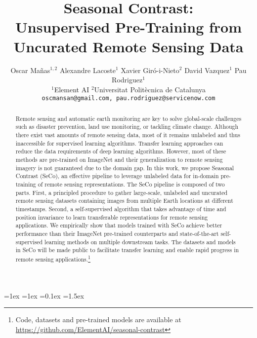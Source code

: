 \documentclass[10pt,twocolumn,letterpaper]{article}
\newcommand{\Methodname}[0]{Seasonal Contrast}
\newcommand{\methodname}[0]{SeCo}
\begin{document}
\iftrue
\abovecaptionskip=1ex           \belowcaptionskip=1ex           \intextsep=0.1ex         \textfloatsep=1.5ex      \fi



\title{\Methodname{}:\\ Unsupervised Pre-Training from Uncurated Remote Sensing Data}

\author{Oscar Mañas$^{1,2}$ \quad Alexandre Lacoste$^1$ \quad Xavier Giró-i-Nieto$^2$ \quad David Vazquez$^1$ \quad Pau Rodriguez$^1$\\
\small $^1$Element AI \quad \quad $^2$Universitat Politècnica de Catalunya\\
{\tt\small oscmansan@gmail.com, pau.rodriguez@servicenow.com}
}

\maketitle
\ificcvfinal\thispagestyle{empty}\fi

\begin{abstract}
   Remote sensing and automatic earth monitoring are key to solve global-scale challenges such as disaster prevention, land use monitoring, or tackling climate change. Although there exist vast amounts of remote sensing data, most of it remains unlabeled and thus inaccessible for supervised learning algorithms. Transfer learning approaches can reduce the data requirements of deep learning algorithms.  However, most of these methods are pre-trained on ImageNet and their generalization to remote sensing imagery is not guaranteed due to the domain gap. In this work, we propose \Methodname{} (\methodname{}), an effective pipeline to leverage unlabeled data for in-domain pre-training of remote sensing representations. The \methodname{} pipeline is composed of two parts. First, a principled procedure to gather large-scale, unlabeled and uncurated remote sensing datasets containing images from multiple Earth locations at different timestamps. Second, a self-supervised algorithm that takes advantage of time and position invariance to learn transferable representations for remote sensing applications. We empirically show that models trained with \methodname{} achieve better performance than their ImageNet pre-trained counterparts and state-of-the-art self-supervised learning methods on multiple downstream tasks. The datasets and models in \methodname{} will be made public to facilitate transfer learning and enable rapid progress in remote sensing applications.\footnote{Code, datasets and pre-trained models are available at \url{https://github.com/ElementAI/seasonal-contrast}}
\end{abstract}
\end{document}
